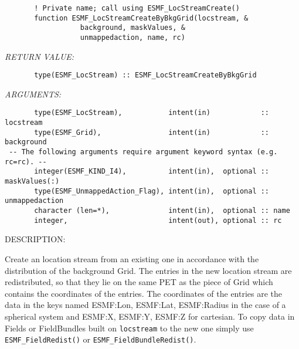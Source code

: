  
\begin{verbatim}       ! Private name; call using ESMF_LocStreamCreate()
       function ESMF_LocStreamCreateByBkgGrid(locstream, &
                  background, maskValues, &
                  unmappedaction, name, rc)
 \end{verbatim}{\em RETURN VALUE:}
\begin{verbatim}       type(ESMF_LocStream) :: ESMF_LocStreamCreateByBkgGrid
 \end{verbatim}{\em ARGUMENTS:}
\begin{verbatim}       type(ESMF_LocStream),           intent(in)            :: locstream
       type(ESMF_Grid),                intent(in)            :: background
 -- The following arguments require argument keyword syntax (e.g. rc=rc). --
       integer(ESMF_KIND_I4),          intent(in),  optional :: maskValues(:)
       type(ESMF_UnmappedAction_Flag), intent(in),  optional :: unmappedaction
       character (len=*),              intent(in),  optional :: name
       integer,                        intent(out), optional :: rc\end{verbatim}
{\sf DESCRIPTION:\\ }


  
       Create an location stream from an existing one in accordance with 
       the distribution of the background Grid.  The entries
       in the new location stream are redistributed, so that they lie on the same PET
       as the piece of Grid which contains the coordinates of the entries. The coordinates
       of the entries are the data in the keys named ESMF:Lon, ESMF:Lat, ESMF:Radius in the 
       case of a spherical system and ESMF:X, ESMF:Y, ESMF:Z for cartesian. To copy data in
       Fields or FieldBundles built on {\tt locstream} to the new one simply use {\tt ESMF\_FieldRedist()}
       or {\tt ESMF\_FieldBundleRedist()}.
  
